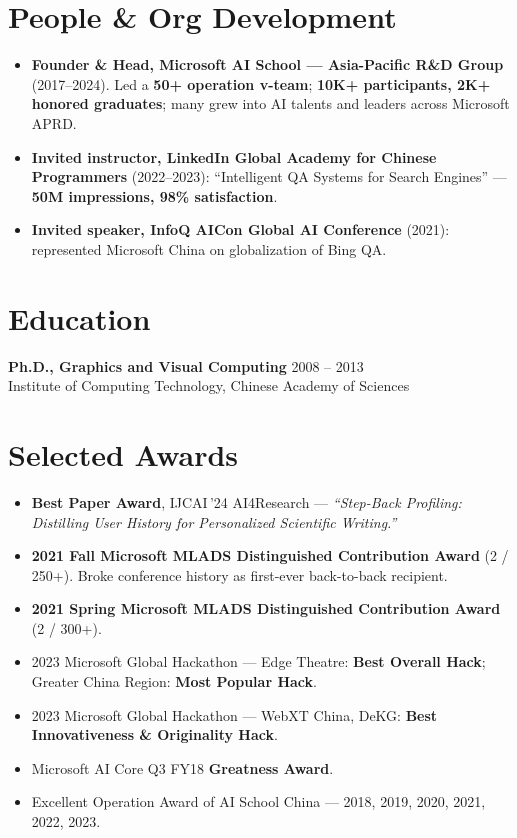 \documentclass[10.5pt,letterpaper]{article}
\begin{document}
\section*{People \& Org Development}
\begin{itemize}
  \item \textbf{Founder \& Head, Microsoft AI School --- Asia-Pacific R\&D Group} (2017--2024). Led a \textbf{50+ operation v-team}; \textbf{10K+ participants, 2K+ honored graduates}; many grew into AI talents and leaders across Microsoft APRD.
  \item \textbf{Invited instructor, LinkedIn Global Academy for Chinese Programmers} (2022--2023): ``Intelligent QA Systems for Search Engines'' --- \textbf{50M impressions, 98\% satisfaction}.
  \item \textbf{Invited speaker, InfoQ AICon Global AI Conference} (2021): represented Microsoft China on globalization of Bing QA.
\end{itemize}

\section*{Education}
\noindent\textbf{Ph.D., Graphics and Visual Computing} \hfill 2008 -- 2013\\
Institute of Computing Technology, Chinese Academy of Sciences

\section*{Selected Awards}
\begin{itemize}
  \item \textbf{Best Paper Award}, IJCAI\,'24 AI4Research --- \textit{``Step-Back Profiling: Distilling User History for Personalized Scientific Writing.''}
  \item \textbf{2021 Fall Microsoft MLADS Distinguished Contribution Award} (2 / 250+). Broke conference history as first-ever back-to-back recipient.
  \item \textbf{2021 Spring Microsoft MLADS Distinguished Contribution Award} (2 / 300+).
  \item 2023 Microsoft Global Hackathon --- Edge Theatre: \textbf{Best Overall Hack}; Greater China Region: \textbf{Most Popular Hack}.
  \item 2023 Microsoft Global Hackathon --- WebXT China, DeKG: \textbf{Best Innovativeness \& Originality Hack}.
  \item Microsoft AI Core Q3 FY18 \textbf{Greatness Award}.
  \item Excellent Operation Award of AI School China --- 2018, 2019, 2020, 2021, 2022, 2023.
\end{itemize}
\end{document}
